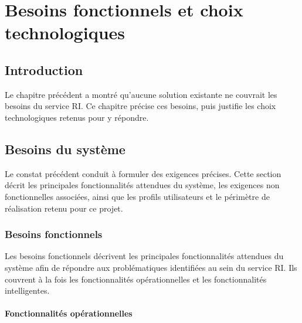 \chapter{Besoins fonctionnels et choix technologiques}
\label{cha:besoins-technologies}
\begingroup
\let\clearpage\relax
\startcontents[chapters]
\endgroup
\newpage

\section*{Introduction}
\justifying
{}
{}

Le chapitre précédent a montré qu'aucune solution existante ne couvrait les besoins du service RI. Ce chapitre précise ces besoins, puis justifie les choix technologiques retenus pour y répondre.

\section{Besoins du système}
\label{sec:besoins-systeme}

Le constat précédent conduit à formuler des exigences précises. Cette section décrit les principales fonctionnalités attendues du système, les exigences non fonctionnelles associées, ainsi que les profils utilisateurs et le périmètre de réalisation retenu pour ce projet.

\subsection{Besoins fonctionnels}

Les besoins fonctionnels décrivent les principales fonctionnalités attendues du système afin de répondre aux problématiques identifiées au sein du service RI. Ils couvrent à la fois les fonctionnalités opérationnelles et les fonctionnalités intelligentes.

\subsubsection{Fonctionnalités opérationnelles}

